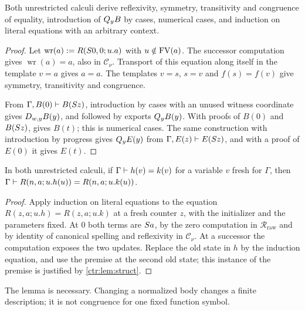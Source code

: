 \begin{lemma}\label{ctr:lem:resources}
Both unrestricted calculi derive reflexivity, symmetry, transitivity and congruence of
equality, introduction of $Q_{y}B$ by cases, numerical cases, and induction on literal
equations with an arbitrary context.
\end{lemma}
\begin{proof}
Let $\operatorname{wr}(a)\mathrel{:=} R(S 0,0;u.a)$ with $u\notin\operatorname{FV}(a)$. The successor
computation gives $\operatorname{wr}(a)=a$, also in $\mathcal C_\nu$. Transport of this
equation along itself in the template $v=a$ gives $a=a$. The templates $v=s$, $s=v$ and
$f(s)=f(v)$ give symmetry, transitivity and congruence.

From $\Gamma,B(0)\vdash B(S z)$, introduction by cases with an unused witness coordinate
gives $D_{w,y}B(y)$, and  followed by  exports $Q_{y}B(y)$. With
proofs of $B(0)$ and $B(S z)$,  gives $B(t)$; this is numerical cases. The
same construction with introduction by progress gives $Q_{y}E(y)$ from
$\Gamma,E(z)\vdash E(S z)$, and with a proof of $E(0)$ it gives $E(t)$.
\end{proof}

\begin{lemma}\label{ctr:lem:bodynative}
In both unrestricted calculi, if $\Gamma\vdash h(v)=k(v)$ for a variable $v$ fresh for
$\Gamma$, then $\Gamma\vdash R(n,a;u.h(u))=R(n,a;u.k(u))$.
\end{lemma}
\begin{proof}
Apply induction on literal equations to the equation $R(z,a;u.h)=R(z,a;u.k)$ at a fresh
counter $z$, with the initializer and the parameters fixed. At $0$ both terms are $S a$,
by the zero computation in $\mathcal R_{\mathrm{raw}}$ and by identity of canonical spelling
and reflexivity in $\mathcal C_\nu$. At a successor the computation exposes the two updates.
Replace the old state in $h$ by the induction equation, and use the premise at the second
old state; this instance of the premise is justified by \cref{ctr:lem:struct}.
\end{proof}

The lemma is necessary. Changing a normalized body changes a finite description; it is not
congruence for one fixed function symbol.

